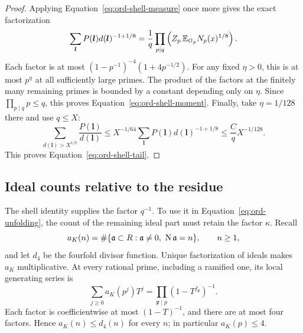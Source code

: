\begin{proof}
Applying Equation~\eqref{eq:ord-shell-measure} once more gives the
exact factorization
\[
 \sum_{\boldsymbol l}
       P(\boldsymbol l)d(\boldsymbol l)^{-1+1/8}
 =\frac1q\prod_{p\mid q}
       \left(Z_p\,\mathbb E_{\mathcal O_p}N_p(x)^{1/8}\right).
\]
Each factor is at most
\((1-p^{-1})^{-4}(1+4p^{-1/2})\).  For any fixed \(\eta>0\), this is
at most \(p^\eta\) at all sufficiently large primes.  The product of
the factors at the finitely many remaining primes is bounded by a
constant depending only on \(\eta\).  Since
\(\prod_{p\mid q}p\le q\), this proves
Equation~\eqref{eq:ord-shell-moment}.  Finally, take \(\eta=1/128\)
there and use \(q\le X\):
\[
 \sum_{d(\boldsymbol l)>X^{1/8}}\frac{P(\boldsymbol l)}{d(\boldsymbol l)}
 \le X^{-1/64}
       \sum_{\boldsymbol l}P(\boldsymbol l)d(\boldsymbol l)^{-1+1/8}
 \le \frac Cq X^{-1/128}.
\]
This proves Equation~\eqref{eq:ord-shell-tail}.
\end{proof}

\subsection{Ideal counts relative to the residue}

The shell identity supplies the factor \(q^{-1}\).  To use it in
Equation~\eqref{eq:ord-unfolding}, the count of the remaining ideal
part must retain the factor \(\kappa\).  Recall
\[
 a_K(n)=\#\{\mathfrak a\subset R:\mathfrak a\ne0,\ \operatorname{N}\mathfrak a=n\},
 \qquad n\ge1,
\]
and let \(d_4\) be the fourfold divisor function.  Unique factorization
of ideals makes \(a_K\) multiplicative.  At every rational prime,
including a ramified one, its local generating series is
\[
 \sum_{j\ge0}a_K(p^j)T^j
       =\prod_{\mathfrak p\mid p}(1-T^{f_{\mathfrak p}})^{-1}.
\]
Each factor is coefficientwise at most \((1-T)^{-1}\), and there are
at most four factors.  Hence \(a_K(n)\le d_4(n)\) for every \(n\);
in particular \(a_K(p)\le4\).

